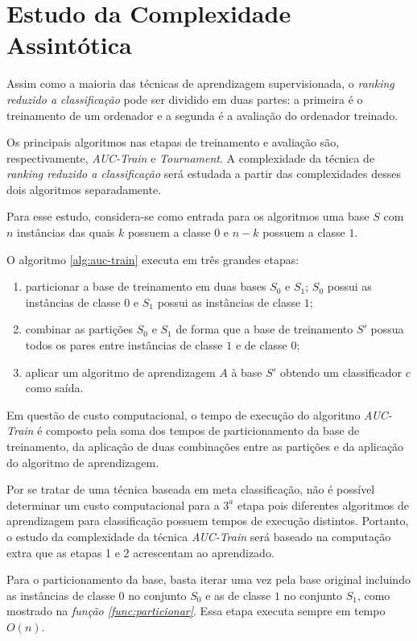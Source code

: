 \section{Estudo da Complexidade Assintótica}

Assim como a maioria das técnicas de aprendizagem supervisionada, o \emph{ranking reduzido a classificação} pode ser dividido em duas partes: a primeira é o treinamento de um ordenador e a segunda é a avaliação do ordenador treinado.

Os principais algoritmos nas etapas de treinamento e avaliação são, respectivamente, \emph{AUC-Train} e \emph{Tournament}. A complexidade da técnica de \emph{ranking reduzido a classificação} será estudada a partir das complexidades desses dois algoritmos separadamente.

Para esse estudo, considera-se como entrada para os algoritmos uma base $S$ com $n$ instâncias das quais $k$ possuem a classe $0$ e $n - k$ possuem a classe $1$.

O algoritmo \ref{alg:auc-train} executa em três grandes etapas:

\begin{enumerate}
    \item particionar a base de treinamento em duas bases $S_0$ e $S_1$; $S_0$ possui as instâncias de classe $0$ e $S_1$ possui as instâncias de classe $1$;
    \item combinar as partições $S_0$ e $S_1$ de forma que a base de treinamento $S'$ possua todos os pares entre instâncias de classe $1$ e de classe $0$;
    \item aplicar um algoritmo de aprendizagem $A$ à base $S'$ obtendo um classificador $c$ como saída.
\end{enumerate}

Em questão de custo computacional, o tempo de execução do algoritmo \emph{AUC-Train} é composto pela soma dos tempos de particionamento da base de treinamento, da aplicação de duas combinações entre as partições e da aplicação do algoritmo de aprendizagem.

Por se tratar de uma técnica baseada em meta classificação, não é possível determinar um custo computacional para a $3^a$ etapa pois diferentes algoritmos de aprendizagem para classificação possuem tempos de execução distintos. Portanto, o estudo da complexidade da técnica \emph{AUC-Train} será baseado na computação extra que as etapas 1 e 2 acrescentam ao aprendizado.

Para o particionamento da base, basta iterar uma vez pela base original incluindo as instâncias de classe $0$ no conjunto $S_0$ e as de classe $1$ no conjunto $S_1$, como mostrado na \emph{função \ref{func:particionar}}. Essa etapa executa sempre em tempo $O(n)$.

